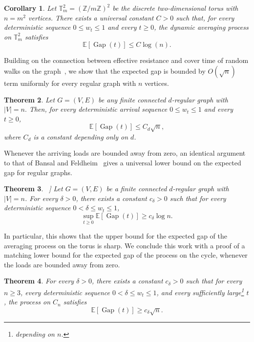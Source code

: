\documentclass[11pt]{article}
\numberwithin{equation}{section}
\newtheorem{theorem}{Theorem}[section]
\newtheorem{corollary}[theorem]{Corollary}
\newcommand{\E}{\mathbb{E}}
\newcommand{\1}{\mathbf{1}}
\newcommand{\Gap}{\operatorname{Gap}}
\begin{document}
\begin{corollary}
\label{cor:torus}
Let \(\mathbb T_m^2 = (\mathbb Z/m\mathbb Z)^2\) be the discrete two-dimensional torus with \(n=m^2\) vertices. There exists a universal constant \(C>0\) such that, for every deterministic sequence \(0\le w_t\le1\) and every \(t\ge0\), the dynamic averaging process on \(\mathbb T_m^2\) satisfies
\[
\E[\Gap(t)]
\le
C\log(n).
\]
\end{corollary}

Building on the connection between effective resistance and cover time of random walks on the graph~\cite{DingLeePeres,ChandraResistance}, we show that the expected gap is bounded by $O(\sqrt n)$ term uniformly for every regular graph with $n$ vertices.

\begin{theorem}
\label{thm:bounded-degree-regular}
Let \(G=(V,E)\) be any finite connected \(d\)-regular graph with \(|V|=n.\)
Then, for every deterministic arrival sequence \(0\le w_t\le1\) and every \(t\ge0\),
\[
\E[\Gap(t)]
\le
C_d\sqrt n,
\]
where $C_d$ is a constant depending only on $d$.
\end{theorem}

Whenever the arriving loads are bounded away from zero, an identical argument to that of Bansal and Feldheim~\cite{BansalFeldheim} gives a universal lower bound on the expected gap for regular graphs. 

\begin{theorem}~\cite[Theorem~1.2]{BansalFeldheim}]
\label{thm:main-lower}
Let \(G=(V,E)\) be a finite connected \(d\)-regular graph with \(|V|=n\). For every \(\delta>0\), there exists a constant \(c_\delta>0\) such that for every deterministic sequence \(0<\delta\le w_t\le  1\),
\[
\sup_{t\ge0}\E[\Gap(t)]
\ge
c_{\delta}\log n.
\]
\end{theorem}

In particular, this shows that the upper bound for the expected gap of the averaging process on the torus is sharp. We conclude this work with a proof of a matching lower bound for the expected gap of the process on the cycle, whenever the loads are bounded away from zero.

\begin{theorem}
\label{thm:cycle-lower}
For every \(\delta>0\), there exists a constant \(c_\delta>0\) such that for every \(n\ge3\), every deterministic sequence \(0<\delta\le w_t\le1\), and every sufficiently large\footnote{depending on \(n\).} \(t\), the process on \(C_n\) satisfies
\[
\E[\Gap(t)]
\ge
c_\delta\sqrt n.
\]
\end{theorem}
\end{document}

